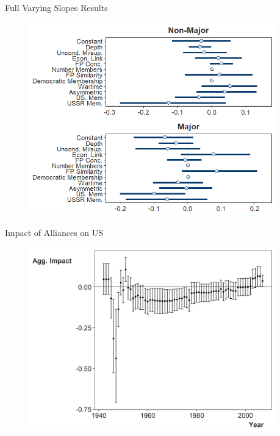 \documentclass[12pt]{beamer}
\begin{document}

\begin{frame}{Full Varying Slopes Results}

\begin{figure}[htbp]
	\centering
		\includegraphics[width=0.95\textwidth]{vs-res-full.png}
\end{figure}

\end{frame}


\begin{frame}{Impact of Alliances on US}


\begin{figure}
	\centering
		\includegraphics[width=0.95\textwidth]{us-agg-imp.png}
\end{figure}


\end{frame}
\end{document}
